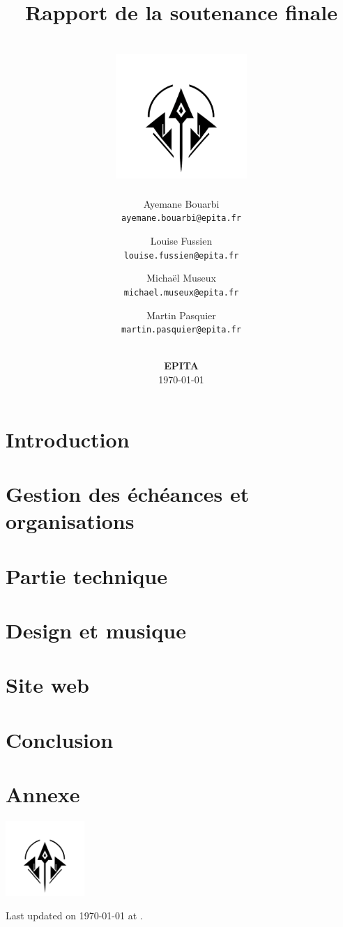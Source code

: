 \documentclass[12pt]{article}
\title{
    Rapport de la soutenance finale \\
    \textbf{\gameName} \\
    \vspace{0.5cm}
    \includegraphics[width=5cm]{assets/logo.png}
    \vspace{4.2cm}
}
\author{
    Ayemane Bouarbi \\
    \texttt{ayemane.bouarbi@epita.fr}
    \vspace{0.5cm}\and
    Louise Fussien \\
    \texttt{louise.fussien@epita.fr}
    \vspace{0.5cm}\and
    Michaël Museux \\
    \texttt{michael.museux@epita.fr}
    \vspace{0.5cm}\and
    Martin Pasquier \\
    \texttt{martin.pasquier@epita.fr}
}
\date{
    \vspace{1.5cm}
    \textbf{\companyName} \\
    \vspace{0.3cm}
    \textbf{EPITA} \\
    \vspace{1.5cm}
    \today
}
\begin{document}
\begin{titlepage}
    \maketitle
    \thispagestyle{empty} %
\end{titlepage}

\newpage
\thispagestyle{empty}
\mbox{}

\newpage
\tableofcontents


\newpage
\section{Introduction}


\newpage
\section{Gestion des échéances et organisations}


\newpage
\section{Partie technique}


\newpage
\section{Design et musique}


\newpage
\section{Site web}



\newpage
\section{Conclusion}


\section{Annexe}

\centering
\vspace*{1.8cm}
\includegraphics[width=3cm]{assets/logo.png}

\vspace*{1cm}
Last updated on \today{} at \currenttime.
\end{document}
